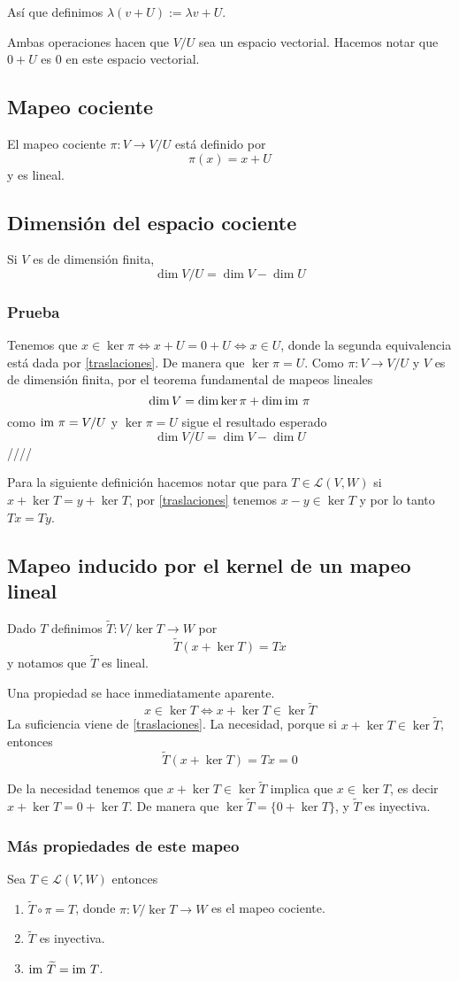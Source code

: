 \documentclass{article}
\begin{document}
Así que definimos $\lambda (v + U):= \lambda v + U$.

Ambas operaciones hacen que $V/U$ sea un espacio vectorial.
Hacemos notar que $0+U$ es $0$ en este espacio vectorial.

\subsection{Mapeo cociente}
El mapeo cociente $\pi: V \rightarrow V/U$ está definido por
$$\pi(x)=x+U$$
y es lineal.

\subsection{Dimensión del espacio cociente}
Si $V$ es de dimensión finita,
$$\dim V/U = \dim V - \dim U$$
\subsubsection*{Prueba}
Tenemos que $x\in\ker \pi \iff x+U = 0+U \iff x\in U$, donde la
segunda equivalencia está dada por \ref{traslaciones}. De
manera que $\ker\pi = U$. Como $\pi: V \rightarrow V/U$ y $V$ es de dimensión finita, por el teorema fundamental de mapeos lineales
$$\dim V = \dim\ker\pi + \dim\text{im }\pi$$
como $\text{im }\pi=V/U$ y $\ker\pi = U$ sigue el resultado esperado
$$\dim V/U = \dim V - \dim U$$
\hfill ////

Para la siguiente definición hacemos notar que para
$T\in\mathcal{L}(V,W)$ si $x+\ker T = y+\ker T$, por \ref{traslaciones}
tenemos $x-y\in\ker T$ y por lo tanto $Tx=Ty$.
\subsection{Mapeo inducido por el kernel de un mapeo lineal}
Dado $T$ definimos $\widetilde T: V/\ker T\rightarrow W$ por
$$\widetilde T(x+\ker T) = Tx$$
y notamos que $\widetilde T$ es lineal.

Una propiedad se hace inmediatamente aparente.
$$x\in\ker T \iff x+\ker T\in \ker\widetilde{T}$$
La suficiencia viene de \ref{traslaciones}.
La necesidad, porque si $x+\ker T\in \ker\widetilde{T}$, entonces
$$\widetilde T(x+\ker T) = Tx = 0$$

De la necesidad tenemos que $x+\ker T\in \ker\widetilde{T}$
implica que $x\in\ker T$, es decir $x +\ker T = 0+\ker T$. De manera
que $\ker\widetilde{T} = \{0+\ker T\}$, y $\widetilde{T}$ es inyectiva.

\subsubsection{Más propiedades de este mapeo}
Sea $T\in\mathcal{L}(V,W)$ entonces
\begin{enumerate}
    \item $\widetilde{T}\circ\pi = T$, donde
    $\pi:V/\ker T\rightarrow W$ es el mapeo cociente.
    \item $\widetilde{T}$ es inyectiva.
    \item $\text{im } \widetilde{T} = \text{im } T$.
\end{enumerate}
\end{document}
